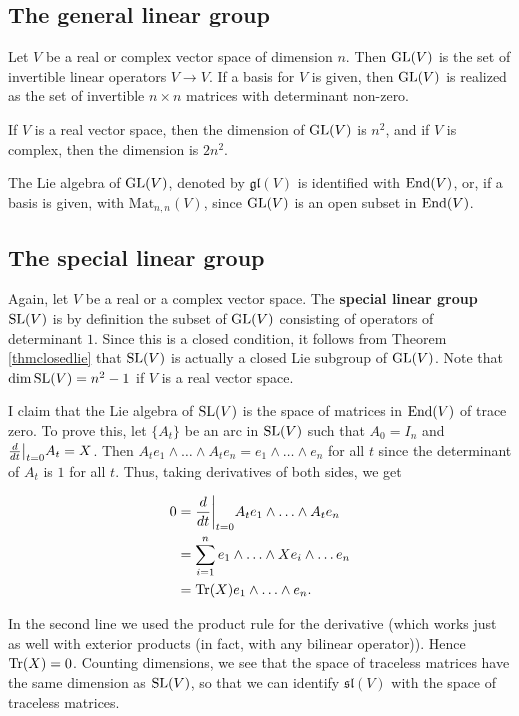 \documentclass[11pt, english]{article}
\begin{document}
\subsection{The general linear group}

Let $V$ be a real or complex vector space of dimension $n$. Then $\operatorname{GL}(V)$ is the set of invertible linear operators $V \to V$. If a basis for $V$ is given, then $\operatorname{GL}(V)$ is realized as the set of invertible $n \times n$ matrices with determinant non-zero.

If $V$ is a real vector space, then the dimension of $\operatorname{GL}(V)$ is $n^2$, and if $V$ is complex, then the dimension is $2n^2$. 

The Lie algebra of $\operatorname{GL}(V)$, denoted by $\mathfrak {gl}(V)$ is identified with $\operatorname{End}(V)$, or, if a basis is given, with $\mathrm{Mat}_{n,n}(V)$, since $\operatorname{GL}(V)$ is an open subset in $\operatorname{End}(V)$.

\subsection{The special linear group}

Again, let $V$ be a real or a complex vector space. The \textbf{special linear group} $\operatorname{SL}(V)$ is by definition the subset of $\operatorname{GL}(V)$ consisting of operators of determinant $1$. Since this is a closed condition, it follows from Theorem \ref{thmclosedlie} that $\operatorname{SL}(V)$ is actually a closed Lie subgroup of $\operatorname{GL}(V)$. Note that $\dim \operatorname{SL}(V) = n^2-1$ if $V$ is a real vector space.

I claim that the Lie algebra of $\operatorname{SL}(V)$ is the space of matrices in $\operatorname{End}(V)$ of trace zero. To prove this, let $\{ A_t \}$ be an arc in $\operatorname{SL}(V)$ such that $A_0 = I_n$ and $\restr{\frac{d}{dt}}{t=0} A_t =X$. Then $A_t e_1 \wedge \ldots  \wedge A_t e_n = e_1 \wedge \ldots \wedge e_n$ for all $t$ since the determinant of $A_t$ is $1$ for all $t$. Thus, taking derivatives of both sides, we get

\begin{align*}
0 &= \restr{ \frac{d}{dt}}{t=0} A_t e_1 \wedge \ldots \wedge A_t e_n \\
&= \sum_{i=1}^n e_1 \wedge \ldots \wedge X e_i \wedge \ldots e_n \\
&= \tr(X) e_1 \wedge \ldots \wedge e_n.
\end{align*}

In the second line we used the product rule for the derivative (which works just as well with exterior products (in fact, with any bilinear operator)). Hence $\operatorname{Tr}(X)=0$. Counting dimensions, we see that the space of traceless matrices have the same dimension as $\operatorname{SL}(V)$, so that we can identify $\mathfrak{sl}(V)$ with the space of traceless matrices.
\end{document}

